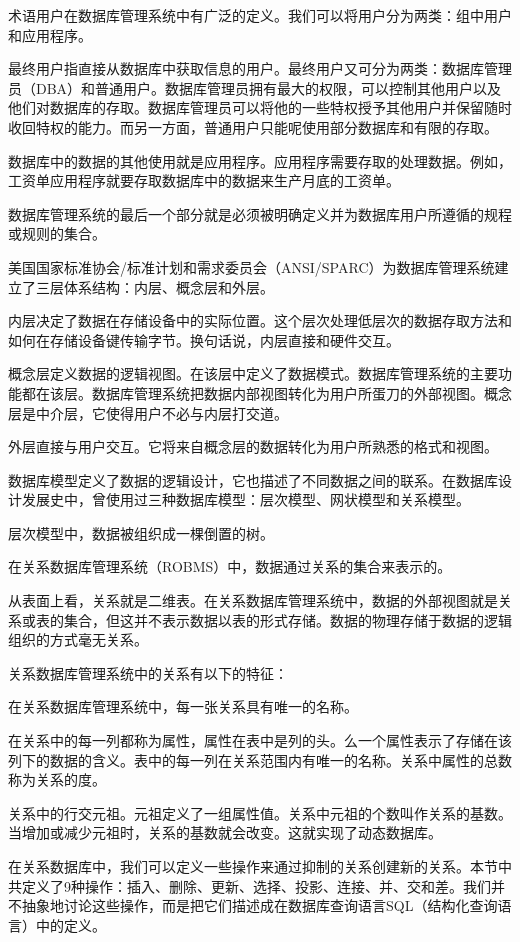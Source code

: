 术语用户在数据库管理系统中有广泛的定义。我们可以将用户分为两类：组中用户和应用程序。

最终用户指直接从数据库中获取信息的用户。最终用户又可分为两类：数据库管理员（DBA）和普通用户。数据库管理员拥有最大的权限，可以控制其他用户以及他们对数据库的存取。数据库管理员可以将他的一些特权授予其他用户并保留随时收回特权的能力。而另一方面，普通用户只能呢使用部分数据库和有限的存取。

数据库中的数据的其他使用就是应用程序。应用程序需要存取的处理数据。例如，工资单应用程序就要存取数据库中的数据来生产月底的工资单。

数据库管理系统的最后一个部分就是必须被明确定义并为数据库用户所遵循的规程或规则的集合。

美国国家标准协会/标准计划和需求委员会（ANSI/SPARC）为数据库管理系统建立了三层体系结构：内层、概念层和外层。

内层决定了数据在存储设备中的实际位置。这个层次处理低层次的数据存取方法和如何在存储设备键传输字节。换句话说，内层直接和硬件交互。

概念层定义数据的逻辑视图。在该层中定义了数据模式。数据库管理系统的主要功能都在该层。数据库管理系统把数据内部视图转化为用户所蛋刀的外部视图。概念层是中介层，它使得用户不必与内层打交道。

外层直接与用户交互。它将来自概念层的数据转化为用户所熟悉的格式和视图。

数据库模型定义了数据的逻辑设计，它也描述了不同数据之间的联系。在数据库设计发展史中，曾使用过三种数据库模型：层次模型、网状模型和关系模型。

层次模型中，数据被组织成一棵倒置的树。

在关系数据库管理系统（ROBMS）中，数据通过关系的集合来表示的。

从表面上看，关系就是二维表。在关系数据库管理系统中，数据的外部视图就是关系或表的集合，但这并不表示数据以表的形式存储。数据的物理存储于数据的逻辑组织的方式毫无关系。

关系数据库管理系统中的关系有以下的特征：

在关系数据库管理系统中，每一张关系具有唯一的名称。

在关系中的每一列都称为属性，属性在表中是列的头。么一个属性表示了存储在该列下的数据的含义。表中的每一列在关系范围内有唯一的名称。关系中属性的总数称为关系的度。

关系中的行交元祖。元祖定义了一组属性值。关系中元祖的个数叫作关系的基数。当增加或减少元祖时，关系的基数就会改变。这就实现了动态数据库。

在关系数据库中，我们可以定义一些操作来通过抑制的关系创建新的关系。本节中共定义了9种操作：插入、删除、更新、选择、投影、连接、并、交和差。我们并不抽象地讨论这些操作，而是把它们描述成在数据库查询语言SQL（结构化查询语言）中的定义。 

